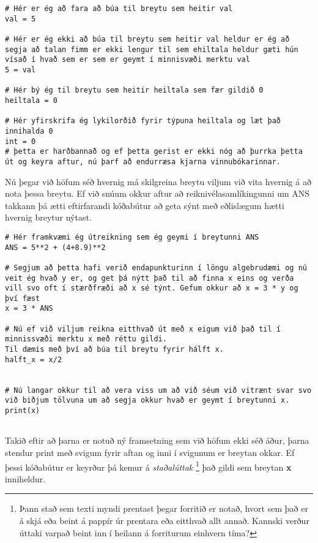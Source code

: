 \documentclass[11pt,fleqn]{book} %
\begin{document}
\begin{lstlisting}[caption=Dæmi um gildisvetingar\, réttar og rangar]
# Hér er ég að fara að búa til breytu sem heitir val
val = 5

# Hér er ég ekki að búa til breytu sem heitir val heldur er ég að segja að talan fimm er ekki lengur til sem ehiltala heldur gæti hún vísað í hvað sem er sem er geymt í minnisvæði merktu val
5 = val

# Hér bý ég til breytu sem heitir heiltala sem fær gildið 0
heiltala = 0

# Hér yfirskrifa ég lykilorðið fyrir týpuna heiltala og læt það innihalda 0
int = 0
# þetta er harðbannað og ef þetta gerist er ekki nóg að þurrka þetta út og keyra aftur, nú þarf að endurræsa kjarna vinnubókarinnar.
\end{lstlisting}

Nú þegar við höfum séð hvernig má skilgreina breytu viljum við vita hvernig á að nota þessa breytu.
Ef við snúum okkur aftur að reiknivélasamlíkingunni um ANS takkann þá ætti eftirfarandi kóðabútur að geta sýnt með eðlislægum hætti hvernig breytur nýtast.

\begin{lstlisting}[caption=Að nota breytu]
# Hér framkvæmi ég útreikning sem ég geymi í breytunni ANS
ANS = 5**2 + (4+8.9)**2

# Segjum að þetta hafi verið endapunkturinn í löngu algebrudæmi og nú veit ég hvað y er, og get þá nýtt það til að finna x eins og verða vill svo oft í stærðfræði að x sé týnt. Gefum okkur að x = 3 * y og því fæst
x = 3 * ANS

# Nú ef við viljum reikna eitthvað út með x eigum við það til í minnissvæði merktu x með réttu gildi.
Til dæmis með því að búa til breytu fyrir hálft x.
halft_x = x/2


# Nú langar okkur til að vera viss um að við séum við vitrænt svar svo við biðjum tölvuna um að segja okkur hvað er geymt í breytunni x.
print(x)


\end{lstlisting}


Takið eftir að þarna er notuð ný framsetning sem við höfum ekki séð áður, þarna stendur print með svigum fyrir aftan og inni í svigunum er breytan okkar.
Ef þessi kóðabútur er keyrður þá kemur á \textit{staðalúttak} 
\footnote{Þann stað sem texti myndi prentast þegar forritið er notað, hvort sem það er á skjá eða beint á pappír úr prentara eða eitthvað allt annað. Kannski verður úttaki varpað beint inn í heilann á forriturum einhvern tíma?} 
það gildi sem breytan \textbf{x} inniheldur.
\end{document}
